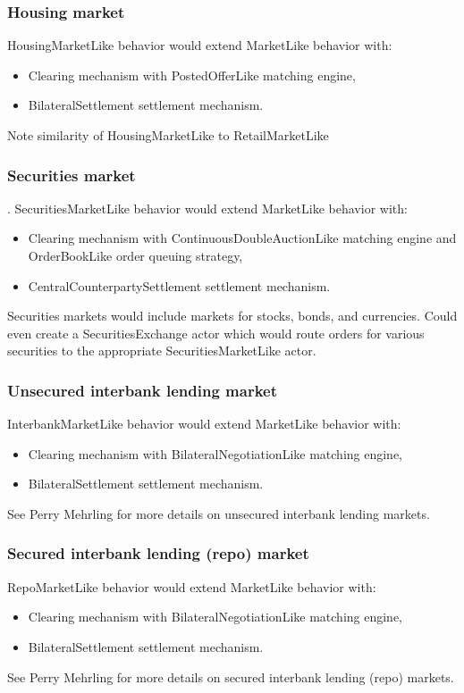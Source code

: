 \documentclass[11pt]{amsart}
\begin{document}
\subsubsection{Housing market} HousingMarketLike behavior would extend MarketLike behavior with:
\begin{itemize}
    \item Clearing mechanism with PostedOfferLike matching engine,
    \item BilateralSettlement settlement mechanism.
\end{itemize}
Note similarity of HousingMarketLike to RetailMarketLike

\subsubsection{Securities market}. SecuritiesMarketLike behavior would extend MarketLike behavior with:
\begin{itemize}
    \item Clearing mechanism with ContinuousDoubleAuctionLike matching engine and OrderBookLike order queuing strategy,
    \item CentralCounterpartySettlement settlement mechanism.
\end{itemize}
Securities markets would include markets for stocks, bonds, and currencies. Could even create a SecuritiesExchange actor which would route orders for various securities to the appropriate SecuritiesMarketLike actor.

\subsubsection{Unsecured interbank lending market} InterbankMarketLike behavior would extend MarketLike behavior with:
\begin{itemize}
    \item Clearing mechanism with BilateralNegotiationLike matching engine,
    \item BilateralSettlement settlement mechanism.
\end{itemize}
See Perry Mehrling for more details on unsecured interbank lending markets.

\subsubsection{Secured interbank lending (repo) market} RepoMarketLike behavior would extend MarketLike behavior with:
\begin{itemize}
    \item Clearing mechanism with BilateralNegotiationLike matching engine,
    \item BilateralSettlement settlement mechanism.
\end{itemize}
See Perry Mehrling for more details on secured interbank lending (repo) markets.
\end{document}
